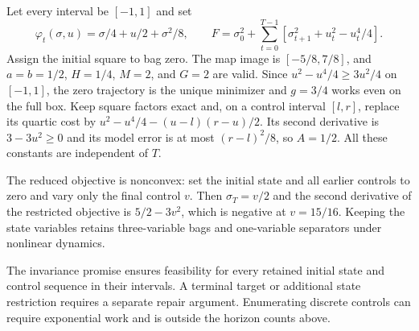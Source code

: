 \begin{example}\label{ex:dynamics}
Let every interval be $[-1,1]$ and set
\[
 \varphi_t(\sigma,u)=\sigma/4+u/2+\sigma^2/8,\qquad
 F=\sigma_0^2+\sum_{t=0}^{T-1}
           [\sigma_{t+1}^2+u_t^2-u_t^4/4].
\]
Assign the initial square to bag zero. The map image is
$[-5/8,7/8]$, and $a=b=1/2$, $H=1/4$, $M=2$, and $G=2$ are valid.
Since $u^2-u^4/4\ge3u^2/4$ on $[-1,1]$, the zero trajectory is the
unique minimizer and $g=3/4$ works even on the full box. Keep square
factors exact and, on a control interval $[l,r]$, replace its quartic cost
by $u^2-u^4/4-(u-l)(r-u)/2$. Its second derivative is
$3-3u^2\ge0$ and its model error is at most $(r-l)^2/8$, so $A=1/2$.
All these constants are independent of $T$.

The reduced objective is nonconvex: set the initial state and all earlier
controls to zero and vary only the final control $v$. Then
$\sigma_T=v/2$ and the second derivative of the restricted objective is
$5/2-3v^2$, which is negative at $v=15/16$. Keeping the state variables
retains three-variable bags and one-variable separators under nonlinear
dynamics.
\end{example}

The invariance promise ensures feasibility for every retained initial state
and control sequence in their intervals. A terminal target or additional
state restriction requires a separate repair argument. Enumerating discrete
controls can require exponential work and is outside the horizon counts
above.

